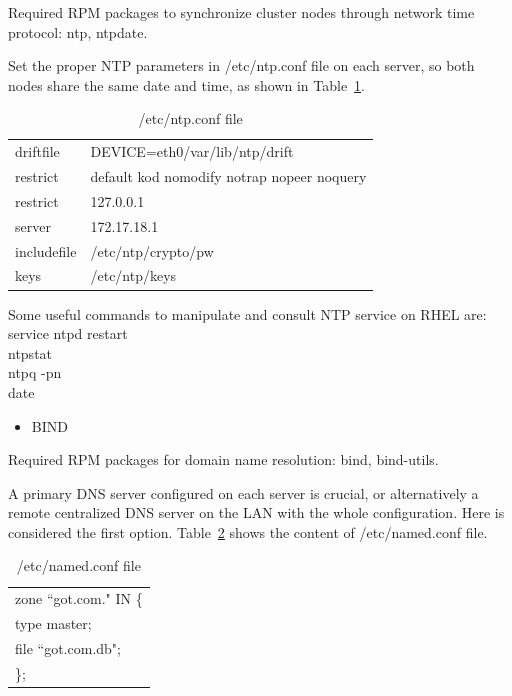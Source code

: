 \documentclass[a4paper, 12pt]{book}
\begin{document}
\noindent Required RPM packages to synchronize cluster nodes through network time protocol: ntp, ntpdate.\bigskip

\noindent Set the proper NTP parameters in /etc/ntp.conf file on each server, so both nodes share the same date and time, as shown in Table~\ref{table:ntp}.

\FloatBarrier
\begin{table}[H]
  \centering
  \begin{tabular}{ | l l | }
    \hline
    driftfile & DEVICE=eth0/var/lib/ntp/drift \\
	restrict & default kod nomodify notrap nopeer noquery \\
    restrict & 127.0.0.1 \\
    server & 172.17.18.1 \\
    includefile & /etc/ntp/crypto/pw \\
    keys & /etc/ntp/keys \\
    \hline
  \end{tabular}
\caption{/etc/ntp.conf file}
\label{table:ntp}
\end{table}


\noindent Some useful commands to manipulate and consult NTP service on RHEL are:\\
\indent service ntpd restart \\
\indent ntpstat \\
\indent ntpq -pn \\
\indent date

\begin{itemize}
	\item BIND
\end{itemize}

\noindent Required RPM packages for domain name resolution: bind, bind-utils.\bigskip

\noindent A primary DNS server configured on each server is crucial, or alternatively a remote centralized DNS server on the LAN with the whole configuration. Here is considered the first option. Table~\ref{table:named} shows the content of /etc/named.conf file.

\FloatBarrier
\begin{table}[H]
  \centering
  \begin{tabular}{ | l | }
    \hline
	  zone ``got.com." IN \{ \\
       type master; \\
       file ``got.com.db"; \\
       \}; \\
    \hline
  \end{tabular}
\caption{/etc/named.conf file}
\label{table:named}
\end{table}
\end{document}
